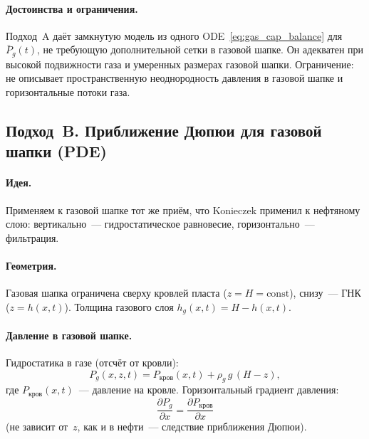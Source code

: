 \documentclass[12pt,a4paper]{article}
\begin{document}
\paragraph{Достоинства и ограничения.}
Подход~A даёт замкнутую модель из одного ODE~\eqref{eq:gas_cap_balance}
для $\bar{P}_g(t)$, не требующую дополнительной сетки в газовой шапке.
Он адекватен при высокой подвижности газа и умеренных размерах
газовой шапки. Ограничение: не описывает пространственную неоднородность
давления в газовой шапке и горизонтальные потоки газа.

\subsection{Подход~B. Приближение Дюпюи для газовой шапки (PDE)}
\label{sec:gas_cap_PDE}

\paragraph{Идея.}
Применяем к газовой шапке тот же приём, что Konieczek применил к
нефтяному слою: вертикально~--- гидростатическое равновесие,
горизонтально~--- фильтрация.

\paragraph{Геометрия.}
Газовая шапка ограничена сверху кровлей пласта ($z = H = \mathrm{const}$),
снизу~--- ГНК ($z = h(x,t)$). Толщина газового слоя
$h_g(x,t) = H - h(x,t)$.

\paragraph{Давление в газовой шапке.}
Гидростатика в газе (отсчёт от кровли):
\begin{equation}\label{eq:Pg_hydrostatic}
  P_g(x,z,t) = P_{\text{кров}}(x,t) + \rho_g\,g\,(H - z),
\end{equation}
где $P_{\text{кров}}(x,t)$~--- давление на кровле.
Горизонтальный градиент давления:
\begin{equation}\label{eq:dPg_dx}
  \frac{\partial P_g}{\partial x}
    = \frac{\partial P_{\text{кров}}}{\partial x}
\end{equation}
(не зависит от~$z$, как и в нефти~--- следствие приближения Дюпюи).
\end{document}
